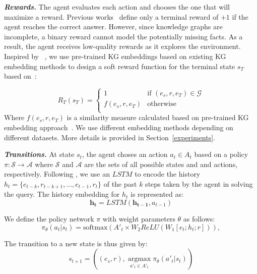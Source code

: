 \textit{\textbf{Rewards.}}
The agent evaluates each action and chooses the one that will maximize a reward. Previous works~\cite{xiong2017deeppath,das2017go} define only a terminal reward of $+1$ if the agent reaches the correct answer. However, since knowledge graphs are incomplete, a binary reward cannot model the potentially missing facts. As a result, the agent receives low-quality rewards as it explores the environment. Inspired by ~\cite{lin2018multi}, we use pre-trained KG embeddings based on existing KG embedding methods to design a soft reward function for the terminal state $s_T$ based on~\cite{ng1999policy}:

\begin{equation}
 R_T(s_T) =
    \begin{cases}
    1 & \text{if $(e_s, r, e_T) \in \mathcal{G}$}\\
    f(e_s, r, e_T) & \text{otherwise}\\ 
    \end{cases} 
\end{equation}
Where $f(e_s, r, e_T)$ is a similarity measure calculated based on pre-trained KG embedding approach~\cite{lin2018multi}. We use different embedding methods depending on different datasets. More details is provided in Section~\ref{experiments}.

\textit{\textbf{Transitions.}}
At state $s_t$, the agent choses an action  $a_t \in A_t$ based on a policy $\pi : \mathcal{S} \rightarrow \mathcal{A}$ where $\mathcal{S}$ and $\mathcal{A}$ are the sets of all possible states and and actions, respectively. Following \cite{lin2018multi}, we use an $LSTM$ to encode the history $h_t=\{e_{t-k},r_{t-k+1},...,e_{t-1},r_{t}\}$ of the past $k$ steps taken by the agent in solving the query. The history embedding for $h_t$ is represented as:
\begin{equation}
    \mathbf{h_t} = LSTM(\mathbf{h_{t-1}},a_{t-1})
\end{equation}

We define the policy network $\pi$ with weight parameters $\theta$ as follows:
\begin{equation}
    \pi_{\theta}(a_t|s_t) = \text{softmax}(A'_t \times W_2 ReLU(W_1[e_t; h_t; r])),
\end{equation}

The transition to a new state is thus given by:
\begin{equation}
    s_{t+1} = ((e_s, r), \operatorname*{argmax}_{a'_t \in A'_t}\pi_{\theta}(a'_t|s_t))
\end{equation}

